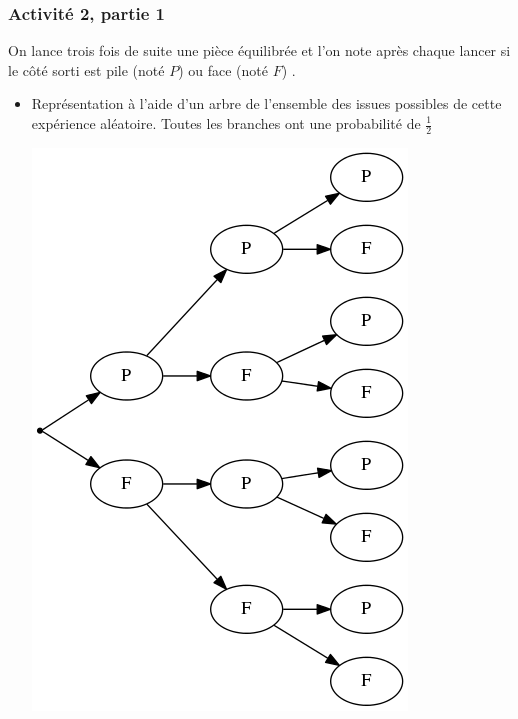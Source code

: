 \documentclass[11pt, hyperref={urlcolor=red,%
            linkcolor=blue, %
            colorlinks=true}]{beamer}
\begin{document}
\begin{frame}
\frametitle{Activité 2,  partie 1}
\label{activite2}

On lance trois fois de suite une pièce équilibrée et l'on note après chaque lancer si le côté sorti est  pile (noté $P$) ou  face (noté $F$) .

\begin{itemize}
\pause \item Représentation  à l'aide d'un arbre de l'ensemble des issues possibles de cette expérience aléatoire. Toutes les branches ont une probabilité de $\frac{1}{2}$

\begin{center}
\includegraphics[scale=0.2]{images/pieces-3lancers.png}
\end{center}

\end{itemize}  


\end{frame}
\end{document}
